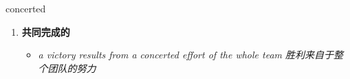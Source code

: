 
\begin{frame}
{\huge concerted}
\begin{center}
\begin{enumerate}\Large
  \item \textbf{共同完成的}
  \begin{itemize}
    \item \em{\Large{a victory results from a concerted effort of the whole team 胜利来自于整个团队的努力}}
  \end{itemize}
\end{enumerate}
\end{center}
\end{frame}
